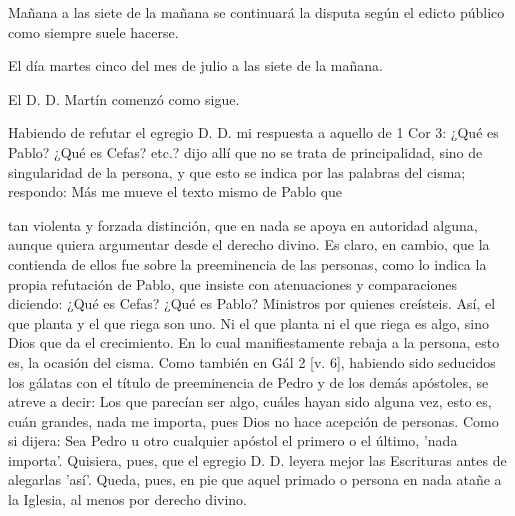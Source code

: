 Mañana a las siete de la mañana se continuará la disputa según el edicto público como siempre suele hacerse.

El día martes cinco del mes de julio a las siete de la mañana.

El D. D. Martín comenzó como sigue.

Habiendo de refutar el egregio D. D. mi respuesta a aquello de 1 Cor 3: ¿Qué es Pablo? ¿Qué es Cefas? etc.? dijo allí que no se trata de principalidad, sino de singularidad de la persona, y que esto se indica por las palabras del cisma; respondo: Más me mueve el texto mismo de Pablo que

tan violenta y forzada distinción, que en nada se apoya en autoridad alguna, aunque quiera argumentar desde el derecho divino. Es claro, en cambio, que la contienda de ellos fue sobre la preeminencia de las personas, como lo indica la propia refutación de Pablo, que insiste con atenuaciones y comparaciones diciendo: ¿Qué es Cefas? ¿Qué es Pablo? Ministros por quienes creísteis. Así, el que planta y el que riega son uno. Ni el que planta ni el que riega es algo, sino Dios que da el crecimiento. En lo cual manifiestamente rebaja a la persona, esto es, la ocasión del cisma. Como también en Gál 2 [v. 6], habiendo sido seducidos los gálatas con el título de preeminencia de Pedro y de los demás apóstoles, se atreve a decir: Los que parecían ser algo, cuáles hayan sido alguna vez, esto es, cuán grandes, nada me importa, pues Dios no hace acepción de personas. Como si dijera: Sea Pedro u otro cualquier apóstol el primero o el último, 'nada importa'. Quisiera, pues, que el egregio D. D. leyera mejor las Escrituras antes de alegarlas 'así'. Queda, pues, en pie que aquel primado o persona en nada atañe a la Iglesia, al menos por derecho divino.

